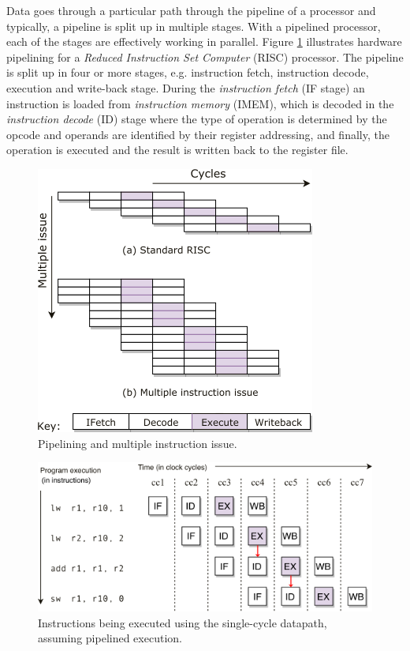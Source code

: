 Data goes through a particular path through the pipeline of a processor and typically, a pipeline is split up in multiple stages. With a pipelined processor, each of the stages are effectively working in parallel. Figure \ref{fig:pipelining} illustrates hardware pipelining for a \emph{Reduced Instruction Set Computer} (RISC) processor. The pipeline is split up in four or more stages, e.g. instruction fetch, instruction decode, execution and write-back stage. During the \emph{instruction fetch} (IF stage) an instruction is loaded from \emph{instruction memory} (IMEM), which is decoded in the \emph{instruction decode} (ID) stage where the type of operation is determined by the opcode and operands are identified by their register addressing, and finally, the operation is executed and the result is written back to the register file.

\begin{figure}[H]
\centering
\includegraphics[width=.5\textwidth]{figures/pipelining}
\caption{Pipelining and multiple instruction issue\cite{tta_codegen}.}
\label{fig:pipelining}
\end{figure}

\begin{figure}[b]
\centering
\includegraphics[width=.8\textwidth]{figures/bypassing_example}
\caption{Instructions being executed using the single-cycle datapath, assuming pipelined execution.}
\label{fig:bypass_problem}
\end{figure}

